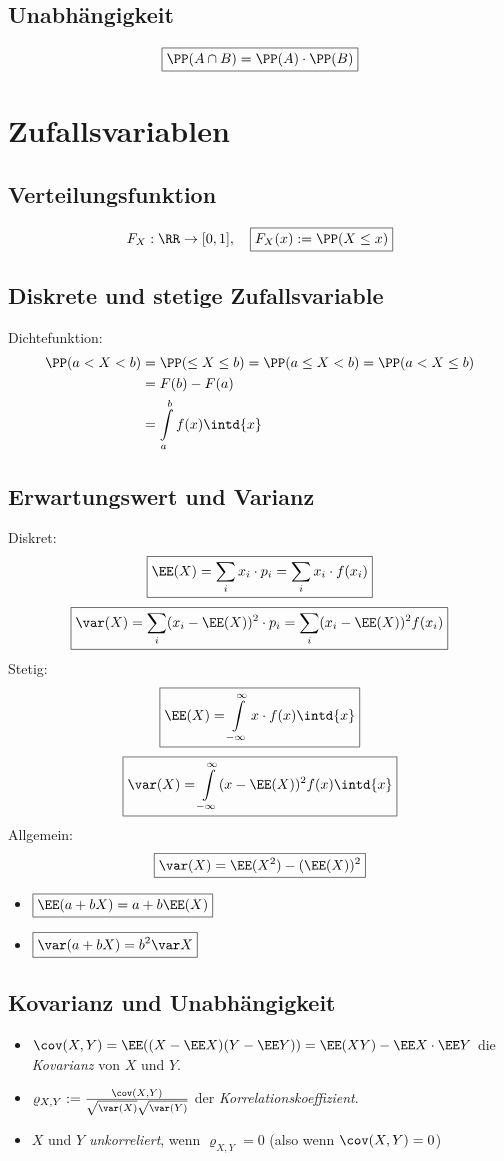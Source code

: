 \documentclass{scrreprt}
\begin{document}
\subsection{Unabhängigkeit}
$$\boxed{\PP(A\cap B)=\PP(A) \cdot \PP(B)}$$

\section{Zufallsvariablen}

\subsection{Verteilungsfunktion}
$$F_X: \RR\to [0,1], \quad \boxed{F_X(x):=\PP(X \leq x)}$$

\subsection{Diskrete und stetige Zufallsvariable}
Dichtefunktion:
\begin{align*}
\PP(a < X<b) &= \PP(\leq X \leq b)
= \PP(a \leq X <b) 
= \PP(a < X \leq b)\\
&=F(b)-F(a) \\
&= \int\limits_a^b f(x) \intd{x}
\end{align*}

 \subsection{Erwartungswert und Varianz}
Diskret:
$$\boxed{\EE(X) = \sum_i x_i \cdot p_i = \sum_i x_i \cdot f(x_i)}$$
$$\boxed{\var(X)=\sum_i (x_i - \EE(X))^2 \cdot p_i = \sum_i (x_i - \EE(X))^2 f(x_i)}$$
Stetig:
$$\boxed{\EE(X) = \int\limits_{-\infty}^{\infty} x\cdot f(x) \intd{x}}$$
$$\boxed{\var (X) = \int\limits_{-\infty}^{\infty} (x-\EE(X))^2 f(x) \intd{x}}$$
Allgemein:
$$\boxed{\var (X) = \EE(X^2) - (\EE(X))^2}$$
\begin{itemize}
\item $\boxed{\EE(a+bX)=a+b\EE(X)}$
\item $\boxed{\var(a+bX) = b^2 \var X}$
\end{itemize}


\subsection{Kovarianz und Unabhängigkeit}
\begin{itemize}
\item $\cov(X,Y) = \EE((X-\EE X) ( Y - \EE Y)) = \EE (XY) - \EE X \cdot \EE Y$ die \emph{Kovarianz} von $X$ und $Y$.
\item $\varrho_{X,Y}:=\frac{\cov(X,Y)}{\sqrt{\var(X)}\sqrt{\var(Y)}}$ der \emph{Korrelationskoeffizient}.
\item $X$ und $Y$ \emph{unkorreliert}, wenn $\varrho_{X,Y}=0$ (also wenn $\cov(X,Y) = 0$)
\end{itemize}
\end{document}
